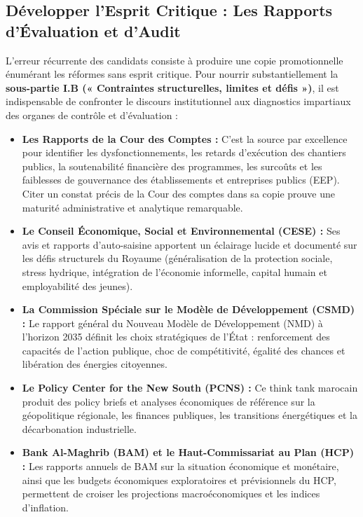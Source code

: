 \subsection{Développer l'Esprit Critique : Les Rapports d'Évaluation et d'Audit}
L'erreur récurrente des candidats consiste à produire une copie promotionnelle énumérant les réformes sans esprit critique. Pour nourrir substantiellement la \textbf{sous-partie I.B (« Contraintes structurelles, limites et défis »)}, il est indispensable de confronter le discours institutionnel aux diagnostics impartiaux des organes de contrôle et d'évaluation :
\begin{itemize}
    \item \textbf{Les Rapports de la Cour des Comptes :} C'est la source par excellence pour identifier les dysfonctionnements, les retards d'exécution des chantiers publics, la soutenabilité financière des programmes, les surcoûts et les faiblesses de gouvernance des établissements et entreprises publics (EEP). Citer un constat précis de la Cour des comptes dans sa copie prouve une maturité administrative et analytique remarquable.
    \item \textbf{Le Conseil Économique, Social et Environnemental (CESE) :} Ses avis et rapports d'auto-saisine apportent un éclairage lucide et documenté sur les défis structurels du Royaume (généralisation de la protection sociale, stress hydrique, intégration de l'économie informelle, capital humain et employabilité des jeunes).
    \item \textbf{La Commission Spéciale sur le Modèle de Développement (CSMD) :} Le rapport général du Nouveau Modèle de Développement (NMD) à l'horizon 2035 définit les choix stratégiques de l'État : renforcement des capacités de l'action publique, choc de compétitivité, égalité des chances et libération des énergies citoyennes.
    \item \textbf{Le Policy Center for the New South (PCNS) :} Ce think tank marocain produit des policy briefs et analyses économiques de référence sur la géopolitique régionale, les finances publiques, les transitions énergétiques et la décarbonation industrielle.
    \item \textbf{Bank Al-Maghrib (BAM) et le Haut-Commissariat au Plan (HCP) :} Les rapports annuels de BAM sur la situation économique et monétaire, ainsi que les budgets économiques exploratoires et prévisionnels du HCP, permettent de croiser les projections macroéconomiques et les indices d'inflation.
\end{itemize}

